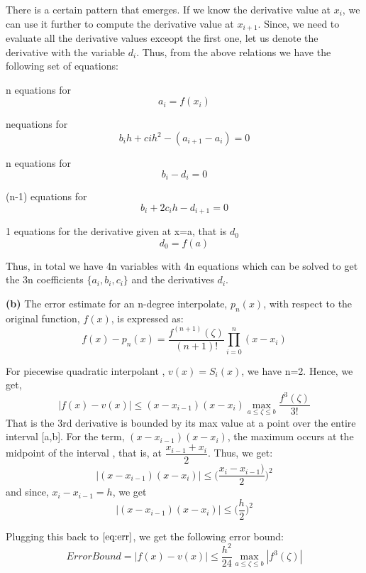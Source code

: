 \documentclass{article}
\renewcommand\part[1]{\vspace{.10in}\textbf{(#1)}}
\begin{document}
There is a certain pattern that emerges. If we know the derivative value at $x_i$, we can use it further to compute the derivative value at $x_{i+1}$. Since, we need to evaluate all the derivative values exceopt the first one, let us denote the derivative with the variable $d_i$. \newline
Thus, from the above relations we have the following set of equations:

n equations for
\[ a_i = f(x_i)\]

nequations for
\[ b_i h + ci h^2 - (a_{i+1} - a_i) = 0\]

n equations for 
\[ b_i - d_i = 0\]

(n-1) equations for 
\[ b_i + 2c_i h - d_{i+1} = 0 \]

1 equations for the derivative given at x=a, that is $d_0$
\[ d_0 = f(a)\]

Thus, in total we have 4n variables with 4n equations which can be solved to get the 3n coefficients $\{a_i, b_i, c_i\}$ and the derivatives $d_i$. \newline


 \part{b} The error estimate for an n-degree interpolate, $p_n(x)$, with respect to the original function, $f(x)$, is expressed as: 
 \[ f(x) - p_n(x) = \dfrac{f^{(n+1)}(\zeta)}{(n+1)!} \prod_{i=0}^n (x - x_i)\]

 For piecewise quadratic interpolant , $v(x) = S_i(x)$, we have n=2. Hence, we get,
 \begin{equation}
  |f(x) - v(x)| \leq (x - x_{i-1})(x - x_i) \max_{a \leq \zeta \leq b} \dfrac{f^3(\zeta)}{3!} 
  \label{eq:err}
 \end{equation}
 That is the 3rd derivative is bounded by its max value at a point over the entire interval [a,b]. 
 For the term, $(x-x_{i-1})(x - x_i)$, the maximum occurs at the midpoint of the interval , that is, at $\dfrac{x_{i-1} + x_i}{2}$. Thus, we get: \newline
 \[ |(x - x_{i-1})(x - x_i)| \leq \bigg ( \dfrac{x_i - x_{i-1})}{2} \bigg )^2 \]
 and since, $x_i - x_{i-1} = h$, we get
 \[ |(x - x_{i-1})(x - x_i)| \leq \bigg ( \dfrac{h}{2} \bigg )^2 \]

 Plugging this back to $\eqref{eq:err}$, we get the following error bound: \newline
 \[ ErrorBound = |f(x) - v(x)| \leq \dfrac{h^2}{24} \max_{a \leq \zeta \leq b} |f^3(\zeta)|\]
\end{document}
